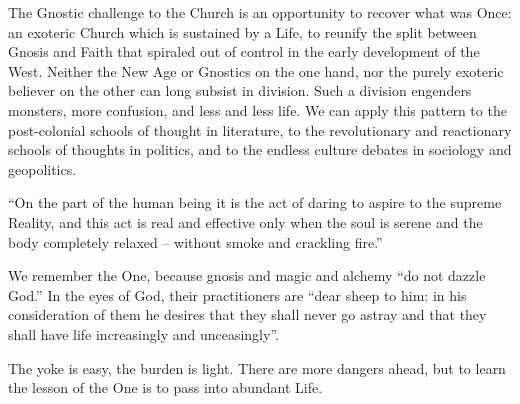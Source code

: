 The Gnostic challenge to the Church is an opportunity to recover what was Once: an exoteric Church which is sustained by a Life, to reunify the split between Gnosis and Faith that spiraled out of control in the early development of the West. Neither the New Age or Gnostics on the one hand, nor the purely exoteric believer on the other can long subsist in division. Such a division engenders monsters, more confusion, and less and less life. We can apply this pattern to the post-colonial schools of thought in literature, to the revolutionary and reactionary schools of thoughts in politics, and to the endless culture debates in sociology and geopolitics.

\begin{quotex}
``On the part of the human being it is the act of daring to aspire to the supreme Reality, and this act is real and effective only when the soul is serene and the body completely relaxed -- without smoke and crackling fire.''
\end{quotex}


We remember the One, because gnosis and magic and alchemy ``do not dazzle God.'' In the eyes of God, their practitioners are ``dear sheep to him: in his consideration of them he desires that they shall never go astray and that they shall have life increasingly and unceasingly''.

The yoke is easy, the burden is light. There are more dangers ahead, but to learn the lesson of the One is to pass into abundant Life.



